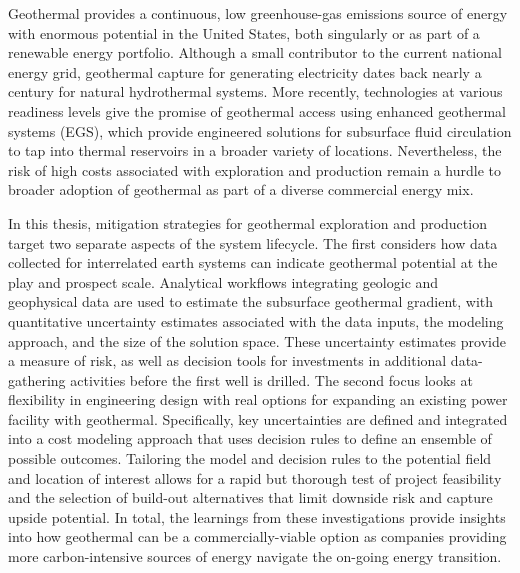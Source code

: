 % 
% 
%
Geothermal provides a continuous, low greenhouse-gas emissions source of energy with enormous potential in the United States, both singularly or as part of a renewable energy portfolio. Although a small contributor to the current national energy grid, geothermal capture for generating electricity dates back nearly a century for natural hydrothermal systems. More recently, technologies at various readiness levels give the promise of geothermal access using enhanced geothermal systems (EGS), which provide engineered solutions for subsurface fluid circulation to tap into thermal reservoirs in a broader variety of locations. Nevertheless, the risk of high costs associated with exploration and production remain a hurdle to broader adoption of geothermal as part of a diverse commercial energy mix.

In this thesis, mitigation strategies for geothermal exploration and production target two separate aspects of the system lifecycle. The first considers how data collected for interrelated earth systems can indicate geothermal potential at the play and prospect scale. Analytical workflows integrating geologic and geophysical data are used to estimate the subsurface geothermal gradient, with quantitative uncertainty estimates associated with the data inputs, the modeling approach, and the size of the solution space. These uncertainty estimates provide a measure of risk, as well as decision tools for investments in additional data-gathering activities before the first well is drilled. The second focus looks at flexibility in engineering design with real options for expanding an existing power facility with geothermal. Specifically, key uncertainties are defined and integrated into a cost modeling approach that uses decision rules to define an ensemble of possible outcomes. Tailoring the model and decision rules to the potential field and location of interest allows for a rapid but thorough test of project feasibility and the selection of build-out alternatives that limit downside risk and capture upside potential. In total, the learnings from these investigations provide insights into how geothermal can be a commercially-viable option as companies providing more carbon-intensive sources of energy navigate the on-going energy transition.